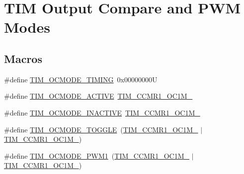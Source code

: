 \hypertarget{group___t_i_m___output___compare__and___p_w_m__modes}{}\section{T\+IM Output Compare and P\+WM Modes}
\label{group___t_i_m___output___compare__and___p_w_m__modes}
\subsection*{Macros}
\begin{DoxyCompactItemize}
\item 
\#define \mbox{\hyperlink{group___t_i_m___output___compare__and___p_w_m__modes_gafae6b98b4b854fbfffd9a5ebc59c8f61}{T\+I\+M\+\_\+\+O\+C\+M\+O\+D\+E\+\_\+\+T\+I\+M\+I\+NG}}~0x00000000U
\item 
\#define \mbox{\hyperlink{group___t_i_m___output___compare__and___p_w_m__modes_ga111d1023e3ac6ef5544775c3863b4b12}{T\+I\+M\+\_\+\+O\+C\+M\+O\+D\+E\+\_\+\+A\+C\+T\+I\+VE}}~\mbox{\hyperlink{group___peripheral___registers___bits___definition_ga410a4752a98081bad8ab3f72b28e7c5f}{T\+I\+M\+\_\+\+C\+C\+M\+R1\+\_\+\+O\+C1\+M\+\_}}
\item 
\#define \mbox{\hyperlink{group___t_i_m___output___compare__and___p_w_m__modes_ga890fbb44fd16f2bce962983352d23f53}{T\+I\+M\+\_\+\+O\+C\+M\+O\+D\+E\+\_\+\+I\+N\+A\+C\+T\+I\+VE}}~\mbox{\hyperlink{group___peripheral___registers___bits___definition_ga8b5f6ec25063483641d6dc065d96d2b5}{T\+I\+M\+\_\+\+C\+C\+M\+R1\+\_\+\+O\+C1\+M\+\_}}
\item 
\#define \mbox{\hyperlink{group___t_i_m___output___compare__and___p_w_m__modes_ga368f80fad76018e2bf76084522e47536}{T\+I\+M\+\_\+\+O\+C\+M\+O\+D\+E\+\_\+\+T\+O\+G\+G\+LE}}~(\mbox{\hyperlink{group___peripheral___registers___bits___definition_ga8b5f6ec25063483641d6dc065d96d2b5}{T\+I\+M\+\_\+\+C\+C\+M\+R1\+\_\+\+O\+C1\+M\+\_}} $\vert$ \mbox{\hyperlink{group___peripheral___registers___bits___definition_ga410a4752a98081bad8ab3f72b28e7c5f}{T\+I\+M\+\_\+\+C\+C\+M\+R1\+\_\+\+O\+C1\+M\+\_}})
\item 
\#define \mbox{\hyperlink{group___t_i_m___output___compare__and___p_w_m__modes_ga766271da571888dfecd9130c3887e9c6}{T\+I\+M\+\_\+\+O\+C\+M\+O\+D\+E\+\_\+\+P\+W\+M1}}~(\mbox{\hyperlink{group___peripheral___registers___bits___definition_gac024f6b9972b940925ab5786ee38701b}{T\+I\+M\+\_\+\+C\+C\+M\+R1\+\_\+\+O\+C1\+M\+\_}} $\vert$ \mbox{\hyperlink{group___peripheral___registers___bits___definition_ga8b5f6ec25063483641d6dc065d96d2b5}{T\+I\+M\+\_\+\+C\+C\+M\+R1\+\_\+\+O\+C1\+M\+\_}})

\end{DoxyCompactItemize}
